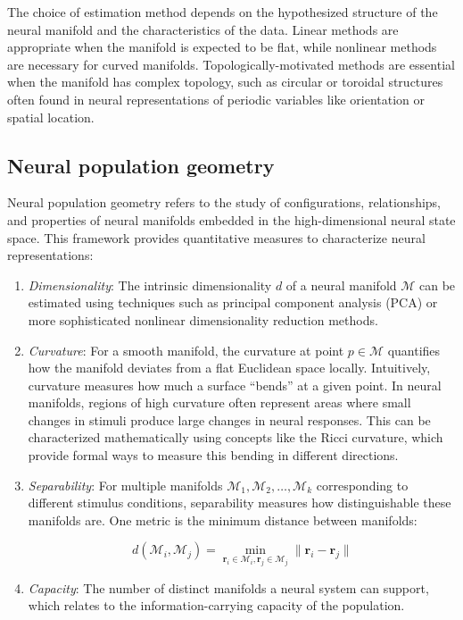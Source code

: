 \documentclass[11pt,a4paper]{article}
\begin{document}
\begin{enumerate}
    The choice of estimation method depends on the hypothesized structure of the neural manifold and the characteristics of the data. Linear methods are appropriate when the manifold is expected to be flat, while nonlinear methods are necessary for curved manifolds. Topologically-motivated methods are essential when the manifold has complex topology, such as circular or toroidal structures often found in neural representations of periodic variables like orientation or spatial location.
\end{enumerate}

\subsection{Neural population geometry}

Neural population geometry refers to the study of configurations, relationships, and properties of neural manifolds embedded in the high-dimensional neural state space. This framework provides quantitative measures to characterize neural representations:

\begin{enumerate}
    \item \textit{Dimensionality}: The intrinsic dimensionality $d$ of a neural manifold $\mathcal{M}$ can be estimated using techniques such as principal component analysis (PCA) or more sophisticated nonlinear dimensionality reduction methods.
    
    \item \textit{Curvature}: For a smooth manifold, the curvature at point $p \in \mathcal{M}$ quantifies how the manifold deviates from a flat Euclidean space locally. Intuitively, curvature measures how much a surface ``bends'' at a given point. In neural manifolds, regions of high curvature often represent areas where small changes in stimuli produce large changes in neural responses. This can be characterized mathematically using concepts like the Ricci curvature, which provide formal ways to measure this bending in different directions.
    
    \item \textit{Separability}: For multiple manifolds $\mathcal{M}_1, \mathcal{M}_2, \ldots, \mathcal{M}_k$ corresponding to different stimulus conditions, separability measures how distinguishable these manifolds are. One metric is the minimum distance between manifolds:
    
    \begin{equation}
    d(\mathcal{M}_i, \mathcal{M}_j) = \min_{\mathbf{r}_i \in \mathcal{M}_i, \mathbf{r}_j \in \mathcal{M}_j} \|\mathbf{r}_i - \mathbf{r}_j\|
    \end{equation}
    
    \item \textit{Capacity}: The number of distinct manifolds a neural system can support, which relates to the information-carrying capacity of the population.
\end{enumerate}
\end{document}
